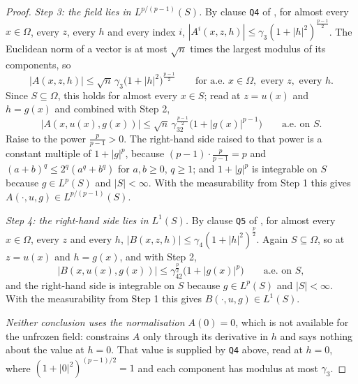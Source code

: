 \begin{proof}
\emph{Step 3: the field lies in $L^{p/(p-1)}(S)$.}  By clause \texttt{Q4} of
, for almost every $x\in\Omega$, every $z$, every
$h$ and every index $i$,
$|A^i(x,z,h)|\le\gamma_3(1+|h|^2)^{\frac{p-1}2}$.  The Euclidean norm of a
vector is at most $\sqrt n$ times the largest modulus of its components, so
\[
\bigl|A(x,z,h)\bigr|\le\sqrt n\,\gamma_3\bigl(1+|h|^2\bigr)^{\frac{p-1}2}
\qquad\text{for a.e. }x\in\Omega,\text{ every }z,\text{ every }h .
\]
Since $S\subseteq\Omega$, this holds for almost every $x\in S$; read at
$z=u(x)$ and $h=g(x)$ and combined with Step 2,
\[
\bigl|A(x,u(x),g(x))\bigr|
\le\sqrt n\,\gamma_32^{\frac{p-1}2}\bigl(1+|g(x)|^{p-1}\bigr)
\qquad\text{a.e. on }S .
\]
Raise to the power $\frac p{p-1}>0$.  The right-hand side raised to that power
is a constant multiple of $1+|g|^{p}$, because
$(p-1)\cdot\frac p{p-1}=p$ and $(a+b)^{q}\le2^{q}(a^{q}+b^{q})$ for
$a,b\ge0$, $q\ge1$; and $1+|g|^p$ is integrable on $S$ because $g\in L^p(S)$
and $|S|<\infty$.  With the measurability from Step 1 this gives
$A(\cdot,u,g)\in L^{p/(p-1)}(S)$.

\emph{Step 4: the right-hand side lies in $L^1(S)$.}  By clause \texttt{Q5} of
, for almost every $x\in\Omega$, every $z$ and
every $h$, $|B(x,z,h)|\le\gamma_4(1+|h|^2)^{\frac p2}$.  Again $S\subseteq\Omega$,
so at $z=u(x)$ and $h=g(x)$, and with Step 2,
\[
\bigl|B(x,u(x),g(x))\bigr|\le\gamma_42^{\frac p2}\bigl(1+|g(x)|^{p}\bigr)
\qquad\text{a.e. on }S ,
\]
and the right-hand side is integrable on $S$ because $g\in L^p(S)$ and
$|S|<\infty$.  With the measurability from Step 1 this gives
$B(\cdot,u,g)\in L^1(S)$.

\emph{Neither conclusion uses the normalisation $A(0)=0$}, which is not
available for the unfrozen field:  constrains $A$
only through its derivative in $h$ and says nothing about the value at $h=0$.
That value is supplied by \texttt{Q4} above, read at $h=0$, where
$(1+|0|^2)^{(p-1)/2}=1$ and each component has modulus at most $\gamma_3$.
\end{proof}
